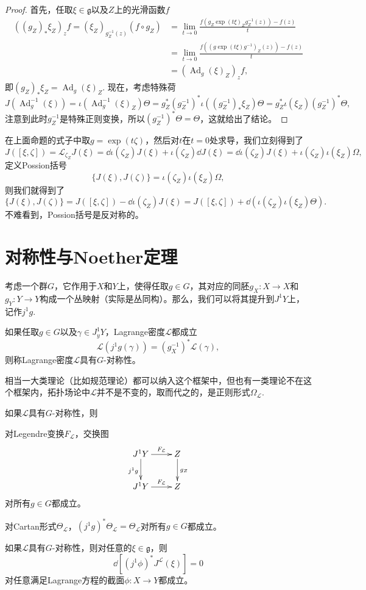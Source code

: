 \begin{proof}
首先，任取$\xi\in \mathfrak g$以及$Z$上的光滑函数$f$
\begin{align*}
((g_Z)_*\xi_Z)_{z} f=(\xi_Z)_{g_Z^{-1}(z)} (f\circ g_Z)&=\lim_{t\to 0}\frac{f(g_Z\exp(t\xi)_Zg_Z^{-1}(z))-f(z)}{t}\\
&=\lim_{t\to 0}\frac{f((g\exp(t\xi)g^{-1})_Z(z))-f(z)}{t}\\
&=(\operatorname{Ad}_g(\xi)_Z)_zf,
\end{align*}
即$(g_Z)_*\xi_Z=\operatorname{Ad}_g(\xi)_Z$. 现在，考虑特殊荷
\[
	J(\operatorname{Ad}^{-1}_g(\xi))=\iota(\operatorname{Ad}_g^{-1}(\xi)_Z)\Theta
	=g_Z^*(g^{-1}_Z)^*\iota\left((g^{-1}_Z)_*\xi_Z\right)\Theta=g_Z^*\iota(\xi_Z)(g^{-1}_Z)^*\Theta,
\]
注意到此时$g^{-1}_Z$是特殊正则变换，所以$(g^{-1}_Z)^*\Theta=\Theta$，这就给出了结论。
\end{proof}

在上面命题的式子中取$g=\exp(t\zeta)$，然后对$t$在$t=0$处求导，我们立刻得到了
\[
	J([\xi,\zeta])=\mathscr L_{\zeta_Z}J(\xi)=\dd \iota(\zeta_Z)J(\xi)+\iota(\zeta_Z)\dd J(\xi)=\dd \iota(\zeta_Z)J(\xi)+\iota(\zeta_Z)\iota(\xi_Z) \Omega,
\]
定义Possion括号
\[
	\{J(\xi),J(\zeta)\}=\iota(\zeta_Z)\iota(\xi_Z) \Omega,
\]
则我们就得到了
\[
	\{J(\xi),J(\zeta)\}=J([\xi,\zeta])-\dd \iota({\zeta_Z})J(\xi)=J([\xi,\zeta])+\dd \left(\iota({\zeta_Z})\iota({\xi_Z})\Theta\right).
\]
不难看到，Possion括号是反对称的。

\section{对称性与Noether定理}

考虑一个群$G$，它作用于$X$和$Y$上，使得任取$g\in G$，其对应的同胚$g_X:X\to X$和$g_Y:Y\to Y$构成一个丛映射（实际是丛同构）。那么，我们可以将其提升到$J^1Y$上，记作$j^1g$. 

\begin{para}[Lagrange密度的对称性]
    如果任取$g\in G$以及$\gamma\in J_y^1 Y$，Lagrange密度$\mathcal L$都成立
    \[
        \mathcal L(j^1g(\gamma))=(g_X^{-1})^*\mathcal L(\gamma),
    \]
    则称Lagrange密度$\mathcal L$具有$G$-对称性。
\end{para}

相当一大类理论（比如规范理论）都可以纳入这个框架中，但也有一类理论不在这个框架内，拓扑场论中$\mathcal L$并不是不变的，取而代之的，是正则形式$\Omega_{\mathcal L}$.

\begin{pro}
    如果$\mathcal L$具有$G$-对称性，则
    \begin{compactenum}
        \item 对Legendre变换$F_{\mathcal L}$，交换图
        \[
            \xymatrix{
                J^1Y\ar[r]^-{F_{\mathcal L}}\ar[d]_{j^1g}&Z\ar[d]^{g_Z}\\ 
                J^1Y\ar[r]^-{F_{\mathcal L}}&Z
            }
        \]
        对所有$g\in G$都成立。
        \item 对Cartan形式$\Theta_{\mathcal L}$，$(j^1g)^*\Theta_{\mathcal L}=\Theta_{\mathcal L}$对所有$g\in G$都成立。
    \end{compactenum}
\end{pro}

\begin{thm}[Noether定理]
    如果$\mathcal L$具有$G$-对称性，则对任意的$\xi\in \mathfrak g$，则
    \[
        \dd \left[ (j^1\phi)^*J^{\mathcal L}(\xi)\right]=0
    \]
    对任意满足Lagrange方程的截面$\phi:X\to Y$都成立。
\end{thm}